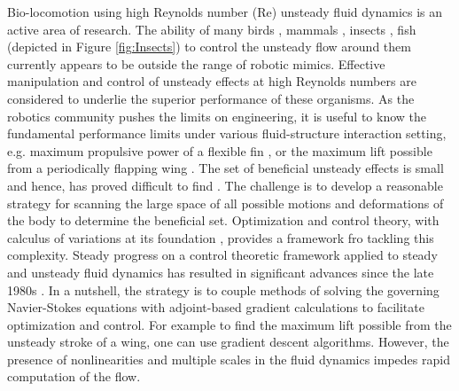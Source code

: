 
Bio-locomotion using high Reynolds number (Re) unsteady fluid dynamics is an active area of research.
The ability of many birds \cite{warrick2005aerodynamics}, mammals \cite{fish2006passive,muijres2008leading}, insects \cite{ellington1996leading,srygley2002unconventional,sane2003aerodynamics,ellington1999novel,wang2005dissecting}, fish \cite{fish2006passive,triantafyllou2000hydrodynamics} (depicted in Figure \ref{fig:Insects}) to control the unsteady flow around them currently appears to be outside the range of robotic mimics.
Effective manipulation and control of unsteady effects at high Reynolds numbers are considered to underlie the superior performance of these organisms.
As the robotics community pushes the limits on engineering, it is useful to know the fundamental performance limits under various fluid-structure interaction setting, e.g. maximum propulsive power of a flexible fin \cite{tokic2012optimal,van2013optimal,milano2005uncovering,eloy2011optimisation}, or the maximum lift possible from a periodically flapping wing \cite{kawamura2008clapping,karpelson2010energetics,wood2008first}.
The set of beneficial unsteady effects is small and hence, has proved difficult to find \cite{pesavento2009flapping}.
The challenge is to develop a reasonable strategy for scanning the large space of all possible motions and deformations of the body to determine the beneficial set.
Optimization and control theory, with calculus of variations at its foundation \cite{lions1971optimal}, provides a framework fro tackling this complexity.
Steady progress on a control theoretic framework applied to steady and unsteady fluid dynamics has resulted in significant advances since the late 1980s \cite{jameson1988aerodynamic,jameson1998optimum,bewley2000general,kim2007linear,wang2009minimal,yu2013high,culbreth2013high}.
In a nutshell, the strategy is to couple methods of solving the governing Navier-Stokes equations with adjoint-based gradient calculations to facilitate optimization and control.
For example to find the maximum lift possible from the unsteady stroke of a wing, one can use gradient descent algorithms.
However, the presence of nonlinearities and multiple scales in the fluid dynamics impedes rapid computation of the flow.

